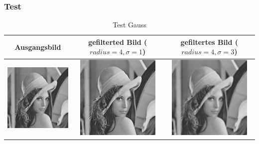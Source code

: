 \documentclass[12pt,german]{article}
\begin{document}
\subsubsection{Test}
\begin{table}[h]
  \centering
  \begin{tabular}{c | c | c}
    \hline
    Ausgangsbild & gefilterted Bild ($ radius = 4, \sigma = 1$) & gefiltertes Bild ($ radius = 4, \sigma = 3$) \\
    \hline
	\includegraphics[width=4cm]{../testData/Gauss/Lena.jpg} & 		 \includegraphics[width=4cm]{../testData/Gauss/LenaR4S1.jpg} &
	\includegraphics[width=4cm]{../testData/Gauss/LenaR4S3.jpg} \\

  \end{tabular}
  \caption{Test Gauss}
  \label{tab:TestGauss}
\end{table}


\newpage
\end{document}

